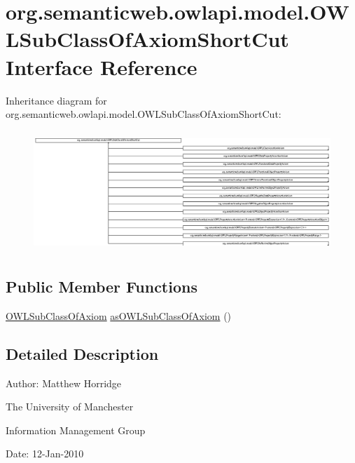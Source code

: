 \hypertarget{interfaceorg_1_1semanticweb_1_1owlapi_1_1model_1_1_o_w_l_sub_class_of_axiom_short_cut}{\section{org.\-semanticweb.\-owlapi.\-model.\-O\-W\-L\-Sub\-Class\-Of\-Axiom\-Short\-Cut Interface Reference}
\label{interfaceorg_1_1semanticweb_1_1owlapi_1_1model_1_1_o_w_l_sub_class_of_axiom_short_cut}
}
Inheritance diagram for org.\-semanticweb.\-owlapi.\-model.\-O\-W\-L\-Sub\-Class\-Of\-Axiom\-Short\-Cut\-:\begin{figure}[H]
\begin{center}
\leavevmode
\includegraphics[height=4.584795cm]{interfaceorg_1_1semanticweb_1_1owlapi_1_1model_1_1_o_w_l_sub_class_of_axiom_short_cut}
\end{center}
\end{figure}
\subsection*{Public Member Functions}
\begin{DoxyCompactItemize}
\item 
\hyperlink{interfaceorg_1_1semanticweb_1_1owlapi_1_1model_1_1_o_w_l_sub_class_of_axiom}{O\-W\-L\-Sub\-Class\-Of\-Axiom} \hyperlink{interfaceorg_1_1semanticweb_1_1owlapi_1_1model_1_1_o_w_l_sub_class_of_axiom_short_cut_a850e59816ba49272a32b005daee9a954}{as\-O\-W\-L\-Sub\-Class\-Of\-Axiom} ()
\end{DoxyCompactItemize}


\subsection{Detailed Description}
Author\-: Matthew Horridge\par
 The University of Manchester\par
 Information Management Group\par
 Date\-: 12-\/\-Jan-\/2010 

